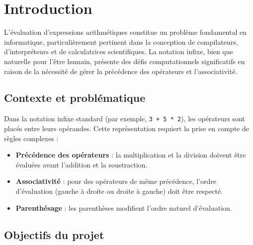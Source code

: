 \documentclass[12pt,a4paper]{article}
\begin{document}


\tableofcontents
\newpage

\section{Introduction}

L'évaluation d'expressions arithmétiques constitue un problème fondamental en informatique, particulièrement pertinent dans la conception de compilateurs, d'interpréteurs et de calculatrices scientifiques. La notation infixe, bien que naturelle pour l'être humain, présente des défis computationnels significatifs en raison de la nécessité de gérer la précédence des opérateurs et l'associativité.

\subsection{Contexte et problématique}

Dans la notation infixe standard (par exemple, \texttt{3 + 5 * 2}), les opérateurs sont placés entre leurs opérandes. Cette représentation requiert la prise en compte de règles complexes :
\begin{itemize}
    \item \textbf{Précédence des opérateurs} : la multiplication et la division doivent être évaluées avant l'addition et la soustraction.
    \item \textbf{Associativité} : pour des opérateurs de même précédence, l'ordre d'évaluation (gauche à droite ou droite à gauche) doit être respecté.
    \item \textbf{Parenthésage} : les parenthèses modifient l'ordre naturel d'évaluation.
\end{itemize}

\subsection{Objectifs du projet}
\end{document}
